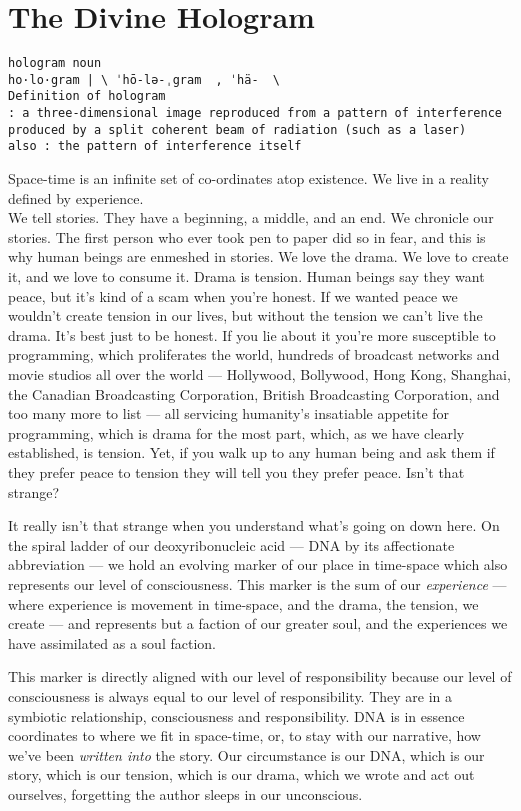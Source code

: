 \section{The Divine Hologram}\label{the-divine-hologram}

\begin{verbatim}
hologram noun
ho·​lo·​gram | \ ˈhō-lə-ˌgram  , ˈhä-  \
Definition of hologram
: a three-dimensional image reproduced from a pattern of interference produced by a split coherent beam of radiation (such as a laser)
also : the pattern of interference itself
\end{verbatim}

Space-time is an infinite set of co-ordinates atop existence. We live in
a reality defined by experience.\\
We tell stories. They have a beginning, a middle, and an end. We
chronicle our stories. The first person who ever took pen to paper did
so in fear, and this is why human beings are enmeshed in stories. We
love the drama. We love to create it, and we love to consume it. Drama
is tension. Human beings say they want peace, but it's kind of a scam
when you're honest. If we wanted peace we wouldn't create tension in our
lives, but without the tension we can't live the drama. It's best just
to be honest. If you lie about it you're more susceptible to
programming, which proliferates the world, hundreds of broadcast
networks and movie studios all over the world --- Hollywood, Bollywood,
Hong Kong, Shanghai, the Canadian Broadcasting Corporation, British
Broadcasting Corporation, and too many more to list --- all servicing
humanity's insatiable appetite for programming, which is drama for the
most part, which, as we have clearly established, is tension. Yet, if
you walk up to any human being and ask them if they prefer peace to
tension they will tell you they prefer peace. Isn't that strange?

It really isn't that strange when you understand what's going on down
here. On the spiral ladder of our deoxyribonucleic acid --- DNA by its
affectionate abbreviation --- we hold an evolving marker of our place in
time-space which also represents our level of consciousness. This marker
is the sum of our \emph{experience} --- where experience is movement in
time-space, and the drama, the tension, we create --- and represents but
a faction of our greater soul, and the experiences we have assimilated
as a soul faction.

This marker is directly aligned with our level of responsibility because
our level of consciousness is always equal to our level of
responsibility. They are in a symbiotic relationship, consciousness and
responsibility. DNA is in essence coordinates to where we fit in
space-time, or, to stay with our narrative, how we've been \emph{written
into} the story. Our circumstance is our DNA, which is our story, which
is our tension, which is our drama, which we wrote and act out
ourselves, forgetting the author sleeps in our unconscious.

